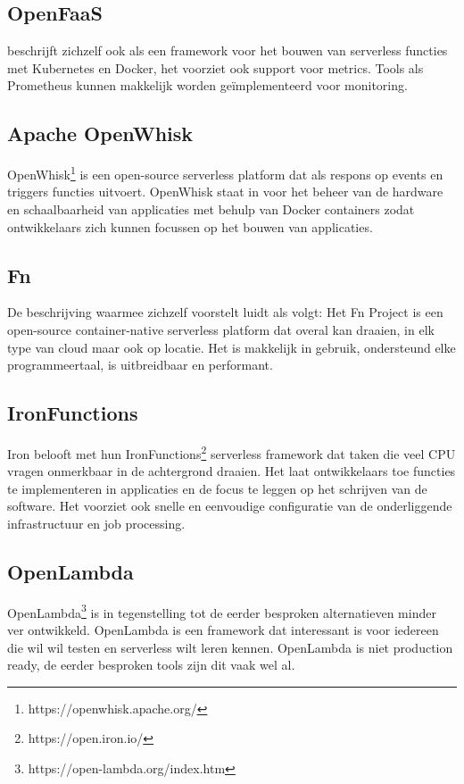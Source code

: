 \subsection{OpenFaaS}
\textcite{OpenFaaS2019} beschrijft zichzelf ook als een framework voor het bouwen van serverless functies met Kubernetes en Docker, het voorziet ook support voor metrics. Tools als Prometheus kunnen makkelijk worden geïmplementeerd voor monitoring.

\subsection{Apache OpenWhisk}
OpenWhisk\footnote{https://openwhisk.apache.org/} is een open-source serverless platform dat als respons op events en triggers functies uitvoert. OpenWhisk staat in voor het beheer van de hardware en schaalbaarheid van applicaties met behulp van Docker containers zodat ontwikkelaars zich kunnen focussen op het bouwen van applicaties.

\subsection{Fn}
De beschrijving waarmee \textcite{FnProject2019} zichzelf voorstelt luidt als volgt: Het Fn Project is een open-source container-native serverless platform dat overal kan draaien, in elk type van cloud maar ook op locatie. Het is makkelijk in gebruik, ondersteund elke programmeertaal, is uitbreidbaar en performant. 

\subsection{IronFunctions}
Iron belooft met hun IronFunctions\footnote{https://open.iron.io/} serverless framework dat taken die veel CPU vragen onmerkbaar in de achtergrond draaien. Het laat ontwikkelaars toe functies te implementeren in applicaties en de focus te leggen op het schrijven van de software. Het voorziet ook snelle en eenvoudige configuratie van de onderliggende infrastructuur en job processing.

\subsection{OpenLambda}
OpenLambda\footnote{https://open-lambda.org/index.htm} is in tegenstelling tot de eerder besproken alternatieven minder ver ontwikkeld. OpenLambda is een framework dat interessant is voor iedereen die wil wil testen en serverless wilt leren kennen. OpenLambda is niet production ready, de eerder besproken tools zijn dit vaak wel al.

